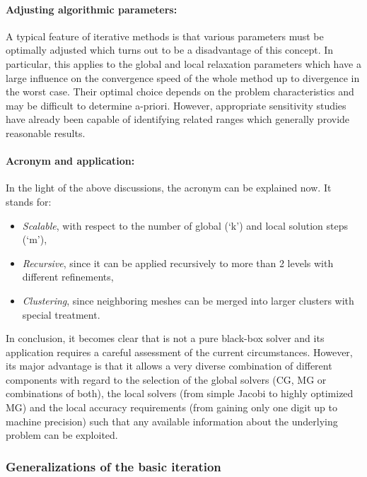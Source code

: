 \paragraph{Adjusting algorithmic parameters:} 
A typical feature of iterative methods is that various parameters must be optimally adjusted which turns out to be a disadvantage of this concept. In particular, this applies to the global and local relaxation parameters which have a large influence on the convergence speed of the whole method up to divergence in the worst case. Their optimal choice depends on the problem characteristics and may be difficult to determine a-priori. However, appropriate sensitivity studies have already been capable of identifying related ranges which generally provide reasonable results.

\paragraph{Acronym and application:}
In the light of the above discussions, the acronym \scarc{} can be explained now. It stands for:
\begin{itemize}
\item {\it Scalable}, with respect to the number of global (`k') and local solution steps (`m'),
\item {\it Recursive}, since it can be applied recursively to more than 2 levels with different refinements,
\item {\it Clustering}, since neighboring meshes can be merged into larger clusters with special treatment.
\end{itemize}

In conclusion, it becomes clear that \scarc{} is not a pure black-box solver and its application requires a careful assessment of the current circumstances. However, its major advantage is that it allows a very diverse combination of different components with regard to the selection of the global solvers (CG, MG or combinations of both), the local solvers (from simple Jacobi to highly optimized MG) and the local accuracy requirements (from gaining only one digit up to machine precision) such that any available information about the underlying problem can be exploited.



\subsubsection{Generalizations of the basic \scarc{} iteration}

